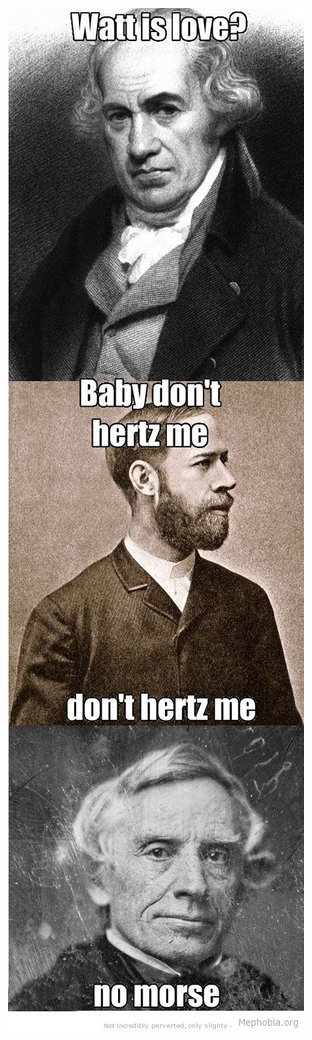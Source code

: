 \begin{frame}

    \begin{columns}[c]
        \column[c]{3.5cm}
        \begin{center}
            \includegraphics[height=1\textheight]{e00/watthertzmorse.jpg}

\end{center}
\end{columns}
\end{frame}
